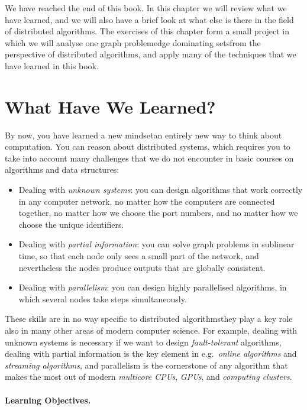
We have reached the end of this book. In this chapter we will review what we have learned, and we will also have a brief look at what else is there in the field of distributed algorithms. The exercises of this chapter form a small project in which we will analyse one graph problem\mydash edge dominating sets\mydash from the perspective of distributed algorithms, and apply many of the techniques that we have learned in this book.


\section{What Have We Learned?}

By now, you have learned a new mindset\mydash an entirely new way to think about computation. You can reason about distributed systems, which requires you to take into account many challenges that we do not encounter in basic courses on algorithms and data structures:
\begin{itemize}
    \item Dealing with \emph{unknown systems}: you can design algorithms that work correctly in any computer network, no matter how the computers are connected together, no matter how we choose the port numbers, and no matter how we choose the unique identifiers.
    \item Dealing with \emph{partial information}: you can solve graph problems in sublinear time, so that each node only sees a small part of the network, and nevertheless the nodes produce outputs that are globally consistent.
    \item Dealing with \emph{parallelism}: you can design highly parallelised algorithms, in which several nodes take steps simultaneously.
\end{itemize}
These skills are in no way specific to distributed algorithms\mydash they play a key role also in many other areas of modern computer science. For example, dealing with unknown systems is necessary if we want to design \emph{fault-tolerant} algorithms, dealing with partial information is the key element in e.g.\ \emph{online algorithms} and \emph{streaming algorithms}, and parallelism is the cornerstone of any algorithm that makes the most out of modern \emph{multicore CPUs}, \emph{GPUs}, and \emph{computing clusters}.


\paragraph{Learning Objectives.}

